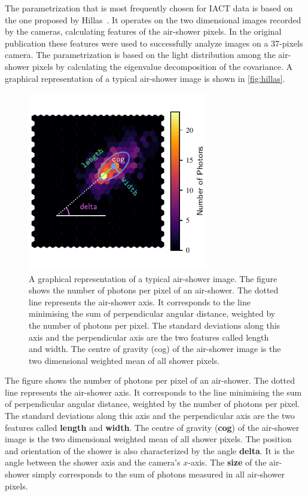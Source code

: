 The parametrization that is most frequently chosen for IACT data is based on
the one proposed by Hillas~\cite{Hillas}. It operates on the two dimensional
images recorded by the cameras, calculating features of the air-shower pixels.
In the original publication these features were used to successfully analyze
images on a 37-pixels camera. The parametrization is based on the light
distribution among the air-shower pixels by calculating the eigenvalue
decomposition of the covariance. A graphical representation of a typical
air-shower image is shown in \autoref{fig:hillas}.
%
\begin{figure}
  \centering%
  \includegraphics[width=0.7\textwidth]{Plots/hillas.pdf}%
  \caption{A graphical representation of a typical air-shower image. The figure shows the number of photons per pixel of an air-shower. The dotted
  line represents the air-shower axis. It corresponds to the line minimising the
  sum of perpendicular angular distance, weighted by the number of photons per
  pixel. The standard deviations along this axis and the perpendicular axis are
  the two features called length and width. The centre of
  gravity (cog) of the air-shower image is the two dimensional weighted
  mean of all shower pixels.}%
  \label{fig:hillas}%
\end{figure}
%
The figure shows the number of photons per pixel of an air-shower. The dotted
line represents the air-shower axis. It corresponds to the line minimising the
sum of perpendicular angular distance, weighted by the number of photons per
pixel. The standard deviations along this axis and the perpendicular axis are
the two features called \textbf{length} and \textbf{width}. The centre of
gravity (\textbf{cog}) of the air-shower image is the two dimensional weighted
mean of all shower pixels. The position and orientation of the shower is also
characterized by the angle \textbf{delta}. It is the angle between the shower
axis and the camera's $x$-axis. The \textbf{size} of the air-shower simply
corresponds to the sum of photons measured in all air-shower pixels.

